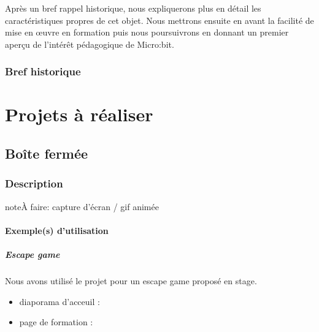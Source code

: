 \documentclass[letterpaper,10pt,french]{sphinxmanual}
\begin{document}
Après un bref rappel historique, nous expliquerons plus en détail
les caractéristiques propres de cet objet.
Nous mettrons ensuite en avant la facilité de mise en œuvre en
formation puis nous poursuivrons en donnant un premier aperçu
de l’intérêt pédagogique de Micro:bit.


\subsection{Bref historique}
\label{\detokenize{decouverte/05_generalite:bref-historique}}

\chapter{Projets à réaliser}
\label{\detokenize{index:projets-a-realiser}}

\section{Boîte fermée}
\label{\detokenize{projets/boite-fermee:boite-fermee}}\label{\detokenize{projets/boite-fermee::doc}}\label{\detokenize{projets/boite-fermee:projetboite}}

\subsection{Description}
\label{\detokenize{projets/boite-fermee:description}}
\begin{sphinxadmonition}{note}{\label{projets/boite-fermee:index-0}À faire:}
capture d’écran / gif animée
\end{sphinxadmonition}


\subsubsection{Exemple(s) d’utilisation}
\label{\detokenize{projets/boite-fermee:exemple-s-d-utilisation}}

\paragraph{Escape game}
\label{\detokenize{projets/boite-fermee-exemple-escape:escape-game}}\label{\detokenize{projets/boite-fermee-exemple-escape::doc}}
Nous avons utilisé le projet  pour un escape
game proposé en stage.
\begin{itemize}
\item {} 
diaporama d’acceuil : 

\item {} 
page de formation : 

\end{itemize}
\end{document}
